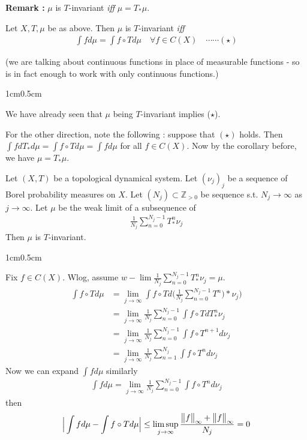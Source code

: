 \documentclass[10pt,a4paper]{report}
\newenvironment{proof}
{\begin{changemargin}{1cm}{0.5cm} 
	}%
	{\end{changemargin}
}
\begin{document}
\bull \textbf{Remark :} $\mu$ is $T$-invariant \emph{iff} $\mu = T_* \mu$.
\s

\lem Let $X, T, \mu$ be as above. Then $\mu$ is $T$-invariant \emph{iff}
\begin{align*}
\int f d\mu = \int f\circ T d\mu \quad \forall f \in C(X) \quad \cdots \cdots (\star)
\end{align*}

(we are talking about continuous functions in place of measurable functions - so is in fact enough to work with only continuous functions.)
\begin{proof}
\pf We have already seen that $\mu$ being $T$-invariant implies ($\star$).

For the other direction, note the following : suppose that $(\star)$ holds. Then $\int f dT_* d\mu = \int f\circ T d\mu = \int fd\mu$ for all $f\in C(X)$. Now by the corollary before, we have $\mu = T_* \mu$.   

\eop
\end{proof}
\s

\thm Let $(X,T)$ be a topological dynamical system. Let $(\nu_j)_j$ be a sequence of Borel probability measures on $X$. Let $(N_j) \subset \mathbb{Z}_{>0}$ be sequence s.t. $N_j \rightarrow \infty$ as $j\rightarrow \infty$. Let $\mu$ be the weak limit of a subsequence of
\begin{align*}
\frac{1}{N_j} \sum_{n=0}^{N_j -1} T^n_* \nu_j 
\end{align*}
Then $\mu$ is $T$-invariant.
\begin{proof}
\pf Fix $f\in C(X)$. Wlog, assume $w-\lim \frac{1}{N_j} \sum_{n=0}^{N_j -1} T^n_* \nu_j = \mu$.
\begin{align*}
\int f\circ T d\mu &= \lim_{j\rightarrow \infty} \int f\circ T d\Big( \frac{1}{N_j} \sum_{n=0}^{N_j-1} T^n)* \nu_j \Big)  \\
& = \lim_{j\rightarrow \infty} \frac{1}{N_j} \sum_{n=0}^{N_j-1} \int f\circ T dT^n_* \nu_j \\
& = \lim_{j\rightarrow \infty}\frac{1}{N_j} \sum_{n=0}^{N_j-1} \int f\circ T^{n+1} d\nu_j \\
& = \lim_{j\rightarrow \infty}\frac{1}{N_j} \sum_{n=1}^{N_j} \int f\circ T^{n} d\nu_j
\end{align*}
Now we can expand $\int fd\mu$ similarly
\begin{align*}
\int fd\mu = \lim_{j\rightarrow \infty} \frac{1}{N_j} \sum_{n=0}^{N_j -1} \int f\circ T^n d\nu_j
\end{align*}
then 
\begin{align*}
\Big| \int fd\mu - \int f\circ T d\mu \Big| \leq \limsup_{j\rightarrow \infty} \frac{\bigl\lVert f\bigr\rVert_{\infty} + \bigl\lVert f\bigr\rVert_{\infty}}{N_j}=0
\end{align*}
\end{proof}
\end{document}
